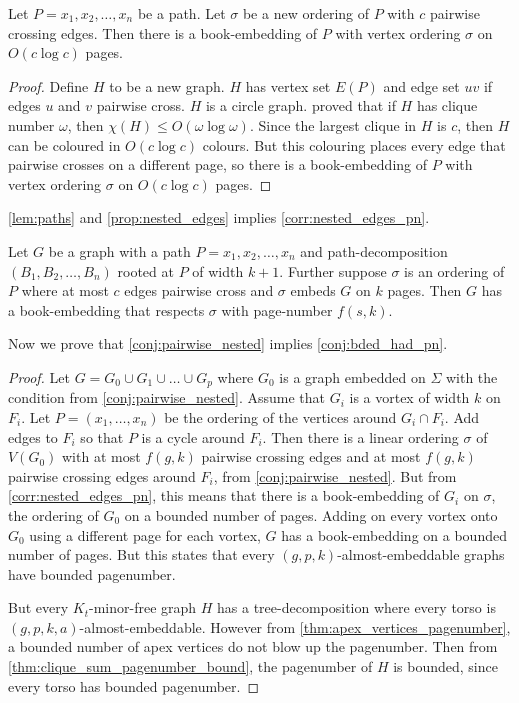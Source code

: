 \begin{lemma}\label{lem:paths}
    Let $P = x_1, x_2, \ldots, x_n$ be a path. Let $\sigma$ be a new ordering of $P$ with $c$ pairwise crossing edges. Then there is a book-embedding of $P$ with vertex ordering $\sigma$ on $O(c \log c)$ pages.
\end{lemma}


\begin{proof}
    Define $H$ to be a new graph. $H$ has vertex set $E(P)$ and edge set $uv$ if edges $u$ and $v$ pairwise cross. $H$ is a circle graph. \textcite{daviesImprovedBoundsColouring2022} proved that if $H$ has clique number $\omega$, then $\chi(H) \leq O(\omega \log \omega)$. Since the largest clique in $H$ is $c$, then $H$ can be coloured in $O(c \log c)$ colours. But this colouring places every edge that pairwise crosses on a different page, so there is a book-embedding of $P$ with vertex ordering $\sigma$ on $O(c \log c)$ pages.
\end{proof}

\cref{lem:paths} and \cref{prop:nested_edges} implies \cref{corr:nested_edges_pn}.

\begin{corollary}\label{corr:nested_edges_pn}
    Let $G$ be a graph with a path $P = x_1, x_2, \ldots, x_n$ and  path-decomposition $(B_1, B_2, \ldots, B_n)$ rooted at $P$ of width $k + 1$. Further suppose $\sigma$ is an ordering of $P$ where at most $c$ edges pairwise cross and $\sigma$ embeds $G$ on $k$ pages. Then $G$ has a book-embedding that respects $\sigma$ with page-number $f(s, k)$.
\end{corollary}

Now we prove that \cref{conj:pairwise_nested} implies \cref{conj:bded_had_pn}. 
\begin{proof}
    Let $G = G_0 \cup G_1 \cup \ldots \cup G_p$ where $G_0$ is a graph embedded on $\Sigma$ with the condition from \cref{conj:pairwise_nested}. Assume that $G_i$ is a vortex of width $k$ on $F_i$. Let $P = (x_1, \ldots, x_n)$ be the ordering of the vertices around $G_i \cap F_i$. Add edges to $F_i$ so that $P$ is a cycle around $F_i$. Then there is a linear ordering $\sigma$ of $V(G_0)$ with at most $f(g, k)$ pairwise crossing edges and at most $f(g, k)$ pairwise crossing edges around $F_i$, from \cref{conj:pairwise_nested}. But from \cref{corr:nested_edges_pn}, this means that there is a book-embedding of $G_i$ on $\sigma$, the ordering of $G_0$ on a bounded number of pages. Adding on every vortex onto $G_0$ using a different page for each vortex, $G$ has a book-embedding on a bounded number of pages. But this states that every $(g, p, k)$-almost-embeddable graphs have bounded pagenumber. 

    But every $K_t$-minor-free graph $H$ has a tree-decomposition where every torso is $(g, p, k, a)$-almost-embeddable. However from \cref{thm:apex_vertices_pagenumber}, a bounded number of apex vertices do not blow up the pagenumber. Then from \cref{thm:clique_sum_pagenumber_bound}, the pagenumber of $H$ is bounded, since every torso has bounded pagenumber.
\end{proof}

